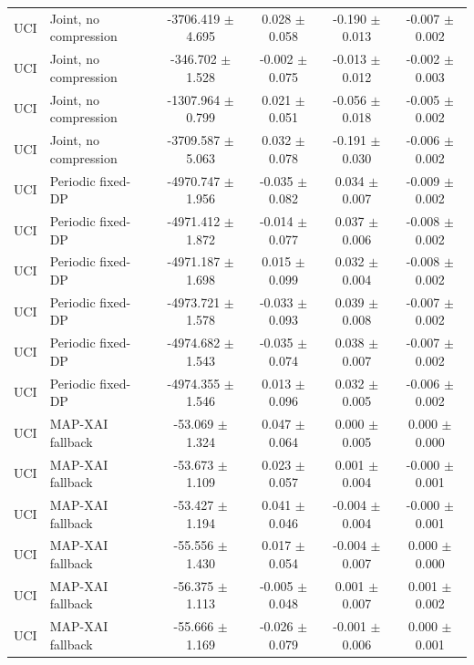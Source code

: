 \begin{table}[t]
\begin{tabular}{llcccc}
UCI & Joint, no compression & -3706.419 $\pm$ 4.695 & 0.028 $\pm$ 0.058 & -0.190 $\pm$ 0.013 & -0.007 $\pm$ 0.002 \\
UCI & Joint, no compression & -346.702 $\pm$ 1.528 & -0.002 $\pm$ 0.075 & -0.013 $\pm$ 0.012 & -0.002 $\pm$ 0.003 \\
UCI & Joint, no compression & -1307.964 $\pm$ 0.799 & 0.021 $\pm$ 0.051 & -0.056 $\pm$ 0.018 & -0.005 $\pm$ 0.002 \\
UCI & Joint, no compression & -3709.587 $\pm$ 5.063 & 0.032 $\pm$ 0.078 & -0.191 $\pm$ 0.030 & -0.006 $\pm$ 0.002 \\
UCI & Periodic fixed-DP & -4970.747 $\pm$ 1.956 & -0.035 $\pm$ 0.082 & 0.034 $\pm$ 0.007 & -0.009 $\pm$ 0.002 \\
UCI & Periodic fixed-DP & -4971.412 $\pm$ 1.872 & -0.014 $\pm$ 0.077 & 0.037 $\pm$ 0.006 & -0.008 $\pm$ 0.002 \\
UCI & Periodic fixed-DP & -4971.187 $\pm$ 1.698 & 0.015 $\pm$ 0.099 & 0.032 $\pm$ 0.004 & -0.008 $\pm$ 0.002 \\
UCI & Periodic fixed-DP & -4973.721 $\pm$ 1.578 & -0.033 $\pm$ 0.093 & 0.039 $\pm$ 0.008 & -0.007 $\pm$ 0.002 \\
UCI & Periodic fixed-DP & -4974.682 $\pm$ 1.543 & -0.035 $\pm$ 0.074 & 0.038 $\pm$ 0.007 & -0.007 $\pm$ 0.002 \\
UCI & Periodic fixed-DP & -4974.355 $\pm$ 1.546 & 0.013 $\pm$ 0.096 & 0.032 $\pm$ 0.005 & -0.006 $\pm$ 0.002 \\
UCI & MAP-XAI fallback & -53.069 $\pm$ 1.324 & 0.047 $\pm$ 0.064 & 0.000 $\pm$ 0.005 & 0.000 $\pm$ 0.000 \\
UCI & MAP-XAI fallback & -53.673 $\pm$ 1.109 & 0.023 $\pm$ 0.057 & 0.001 $\pm$ 0.004 & -0.000 $\pm$ 0.001 \\
UCI & MAP-XAI fallback & -53.427 $\pm$ 1.194 & 0.041 $\pm$ 0.046 & -0.004 $\pm$ 0.004 & -0.000 $\pm$ 0.001 \\
UCI & MAP-XAI fallback & -55.556 $\pm$ 1.430 & 0.017 $\pm$ 0.054 & -0.004 $\pm$ 0.007 & 0.000 $\pm$ 0.000 \\
UCI & MAP-XAI fallback & -56.375 $\pm$ 1.113 & -0.005 $\pm$ 0.048 & 0.001 $\pm$ 0.007 & 0.001 $\pm$ 0.002 \\
UCI & MAP-XAI fallback & -55.666 $\pm$ 1.169 & -0.026 $\pm$ 0.079 & -0.001 $\pm$ 0.006 & 0.000 $\pm$ 0.001 \\
\bottomrule
\end{tabular}
\end{table}
